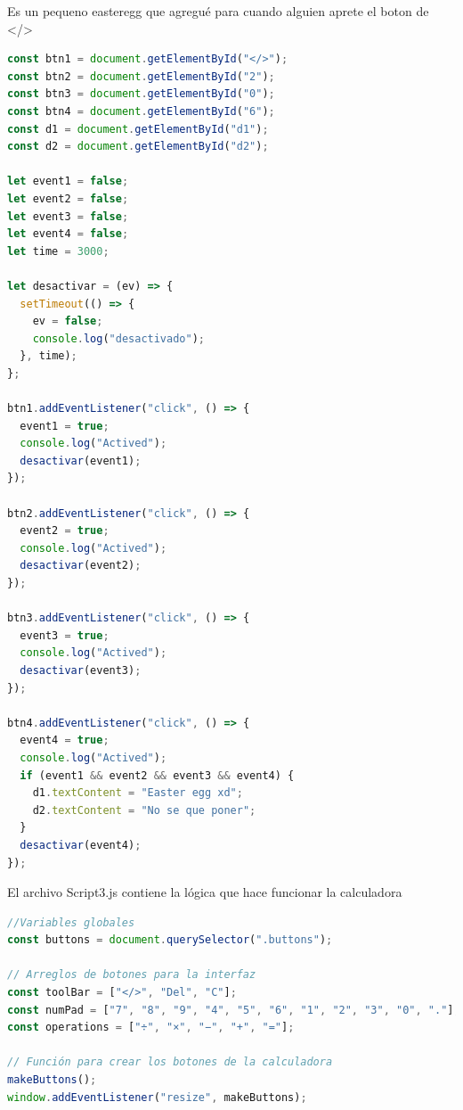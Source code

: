 Es un pequeno easteregg que agregué para cuando alguien aprete el boton de </>
\begin{lstlisting}[language=JavaScript, caption={Archivo easteregg.js}]
const btn1 = document.getElementById("</>");
const btn2 = document.getElementById("2");
const btn3 = document.getElementById("0");
const btn4 = document.getElementById("6");
const d1 = document.getElementById("d1");
const d2 = document.getElementById("d2");

let event1 = false;
let event2 = false;
let event3 = false;
let event4 = false;
let time = 3000;

let desactivar = (ev) => {
  setTimeout(() => {
    ev = false;
    console.log("desactivado");
  }, time);
};

btn1.addEventListener("click", () => {
  event1 = true;
  console.log("Actived");
  desactivar(event1);
});

btn2.addEventListener("click", () => {
  event2 = true;
  console.log("Actived");
  desactivar(event2);
});

btn3.addEventListener("click", () => {
  event3 = true;
  console.log("Actived");
  desactivar(event3);
});

btn4.addEventListener("click", () => {
  event4 = true;
  console.log("Actived");
  if (event1 && event2 && event3 && event4) {
    d1.textContent = "Easter egg xd";
    d2.textContent = "No se que poner";
  }
  desactivar(event4);
});
\end{lstlisting}

El archivo Script3.js contiene la lógica que hace funcionar la calculadora
\begin{lstlisting}[language=JavaScript, caption={Archivo script3.js}]
//Variables globales
const buttons = document.querySelector(".buttons");

// Arreglos de botones para la interfaz
const toolBar = ["</>", "Del", "C"];
const numPad = ["7", "8", "9", "4", "5", "6", "1", "2", "3", "0", "."];
const operations = ["÷", "×", "−", "+", "="];

// Función para crear los botones de la calculadora
makeButtons();
window.addEventListener("resize", makeButtons);
\end{lstlisting}


